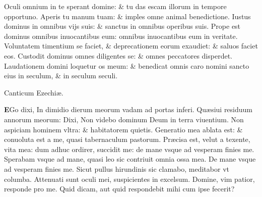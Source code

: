\documentclass[a5paper,10pt]{book}
\def\ae{æ}
\begin{document}
\begin{multicols*}{2}
\newline \color{red} O\color{black}culi omnium in te sperant domine: \& tu das escam illorum in tempore opportuno.
\newline \color{red} A\color{black}peris tu manum tuam: \& imples omne animal benedictione.
\newline \color{red} I\color{black}ustus dominus in omnibus vijs suis: \& sanctus in omnibus operibus suis.
\newline \color{red} P\color{black}rope est dominus omnibus inuocantibus eum: omnibus inuocantibus eum in veritate.
\newline \color{red} V\color{black}oluntatem timentium se faciet, \& deprecationem eorum exaudiet: \& saluos faciet eos.
\newline \color{red} C\color{black}ustodit dominus omnes diligentes se: \& omnes peccatores disperdet.
\newline \color{red} L\color{black}audationem domini loquetur os meum: \& benedicat omnis caro nomini sancto eius in seculum, \& in seculum seculi.
\vspace{-1em}
\begin{center} \color{red}
Canticum Ezechi\ae .
\end{center}
\vspace{-1em}
\lettrine[lines=2]{\bfseries \color{red} E}{}Go dixi, In dimidio dierum meorum vadam ad portas inferi.
\newline \color{red} Q\color{black}u\ae siui residuum annorum meorum: Dixi, Non videbo dominum Deum in terra viuentium.
\newline \color{red} N\color{black}on aspiciam hominem vltra: \& habitatorem quietis.
\newline \color{red} G\color{black}eneratio mea ablata est: \& conuoluta est a me, quasi tabernaculum pastorum.
\newline \color{red} P\color{black}r\ae cisa est, velut a texente, vita mea: dum adhuc ordirer, succidit me: de mane vsque ad vesperam finies me.
\newline \color{red} S\color{black}perabam vsque ad mane, quasi leo sic contriuit omnia ossa mea.
\newline \color{red} D\color{black}e mane vsque ad vesperam finies me. Sicut pullus hirundinis sic clamabo, meditabor vt columba.
\newline \color{red} A\color{black}ttenuati sunt oculi mei, suspicientes in excelsum.
\newline \color{red} D\color{black}omine, vim patior, responde pro me. Quid dicam, aut quid respondebit mihi cum ipse fecerit?

\end{multicols*}
\end{document}
